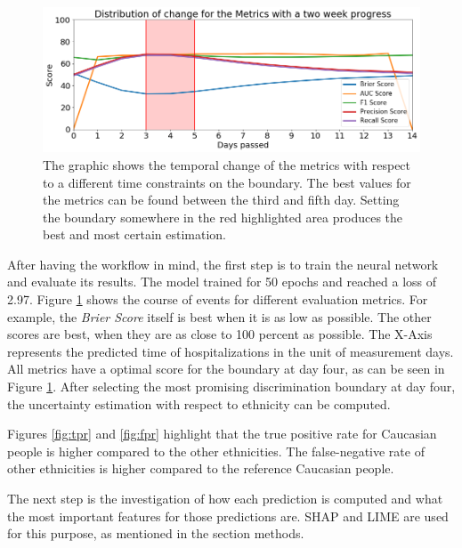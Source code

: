 \documentclass[journal]{IEEEtran}
\begin{document}
\begin{figure}[!b]
	\centering
	\includegraphics[width=0.9\linewidth]{../imgs/metrics_time}
	\caption{The graphic shows the temporal change of the metrics with respect to a different time constraints on the boundary. The best values for the metrics can be found between the third and fifth day. Setting the boundary somewhere in the red highlighted area produces the best and most certain estimation.}
	\label{fig:change}
\end{figure}

After having the workflow in mind, the first step is to train the neural network and evaluate its results. The model trained for 50 epochs and reached a loss of 2.97. Figure \ref{fig:change} shows the course of events for different evaluation metrics. For example, the \textit{Brier Score} itself is best when it is as low as possible. The other scores are best, when they are as close to 100 percent as possible. The X-Axis represents the predicted time of hospitalizations in the unit of measurement days. All metrics have a optimal score for the boundary at day four, as can be seen in Figure \ref{fig:change}. After selecting the most promising discrimination boundary at day four, the uncertainty estimation with respect to ethnicity can be computed. 

Figures \ref{fig:tpr} and \ref{fig:fpr} highlight that the true positive rate for Caucasian people is higher compared to the other ethnicities. The false-negative rate of other ethnicities is higher compared to the reference Caucasian people.  

The next step is the investigation of how each prediction is computed and what the most important features for those predictions are. SHAP and LIME are used for this purpose, as mentioned in the section methods. 
\end{document}
